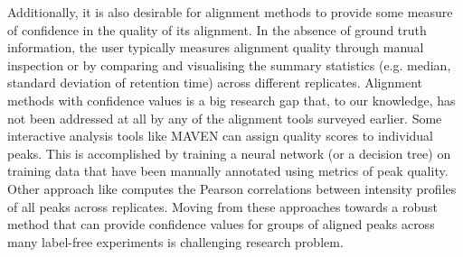Additionally, it is also desirable for alignment methods to provide some measure of confidence in the quality of its alignment. In the absence of ground truth information, the user typically measures alignment quality through manual inspection or by comparing and visualising the summary statistics (e.g. median, standard deviation of retention time) across different replicates. Alignment methods with confidence values is a big research gap that, to our knowledge, has not been addressed at all by any of the alignment tools surveyed earlier. Some interactive analysis tools like MAVEN \cite{Melamud2010} can assign quality scores to individual peaks. This is accomplished by training a neural network (or a decision tree) on training data that have been manually annotated using metrics of peak quality. Other approach like \cite{Brodsky2010} computes the Pearson correlations between intensity profiles of all peaks across replicates. Moving from these approaches towards a robust method that can provide confidence values for groups of aligned peaks across many label-free experiments is challenging research problem.

